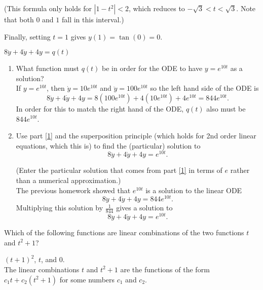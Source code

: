(This formula only holds for $|1 − t^2| < 2$, which reduces to $−\sqrt{3} < t < \sqrt{3}$.
Note that both $0$ and $1$ fall in this interval.)

Finally, setting $t = 1$ gives $y(1) = \tan⁡ (0) =0$.
\clearpage
\begin{homework}
  $8  \ddot{y} + 4  \dot{y} + 4  y = q(t)$
\end{homework}
\begin{enumerate}
\item \label{1} What function must $q(t)$ be in order for the ODE to have $y = e^{10t}$ as a solution? \\

  If $y=e^{10t}$, then $\dot{y}=10 e^{10 t}$ and $\ddot{y}=100 e^{10 t}$ so the left hand side of the ODE is
\begin{equation*}
  8  \ddot{y} + 4  \dot{y} + 4  y = 8 (100 e^{10 t}) + 4  (10 e^{10 t}) + 4  e^{10 t} = 844  e^{10t}.
\end{equation*}
In order for this to match the right hand of the ODE, $q(t)$ also must be $844  e^{10 t}$.

\item Use part \ref{1} and the superposition principle (which holds for 2nd order linear equations,
  which this is) to find the (particular) solution to
  \begin{equation*}
    8  \ddot{y} + 4  \dot{y} + 4  y = e^{10t}.
  \end{equation*}

  (Enter the particular solution that comes from part \ref{1} in terms of $e$ rather
  than a numerical approximation.) \\

  The previous homework showed that $e^{10t}$ is a solution to the linear ODE
  \begin{equation*}
    8  \ddot{y} + 4  \dot{y} + 4  y = 844  e^{10t}.
  \end{equation*}
  Multiplying this solution by $\frac{1}{844}$ gives a solution to
  \begin{equation*}
    8  \ddot{y} + 4  \dot{y} + 4  y = e^{10t}.
  \end{equation*}
\end{enumerate}

\begin{homework}
  Which of the following functions are linear combinations of the two functions $t$ and $t^2 + 1$?
\end{homework}

$(t+1)^2$, $t$, and $0$. \\
The linear combinations $t$ and $t^2+1$ are the functions of the form
$c_1 t + c_2(t^2+1)$ for some numbers $c_1$ and $c_2$.

